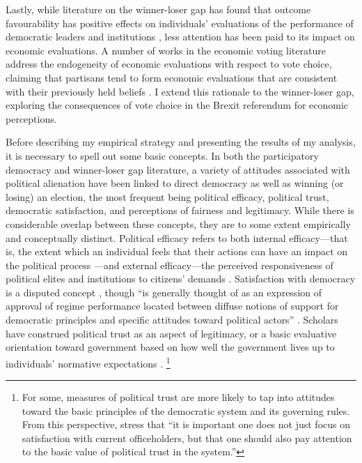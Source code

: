 \documentclass[12pt, letter]{article}
\begin{document}
Lastly, while literature on the winner-loser gap has found that outcome favourability has positive effects on individuals' evaluations of the performance of democratic leaders and institutions \parencite{singh2011winning}, less attention has been paid to its impact on economic evaluations. A number of works in the economic voting literature address the endogeneity of economic evaluations with respect to vote choice, claiming that partisans tend to form economic evaluations that are consistent with their previously held beliefs \parencite{anderson2007end, evans2006political, wlezien1997economic}. I extend this rationale to the winner-loser gap, exploring the consequences of vote choice in the Brexit referendum for economic perceptions.

Before describing my empirical strategy and presenting the results of my analysis, it is necessary to spell out some basic concepts. In both the participatory democracy and winner-loser gap literature, a variety of attitudes associated with political alienation have been linked to direct democracy as well as winning (or losing) an election, the most frequent being political efficacy, political trust, democratic satisfaction, and perceptions of fairness and legitimacy. While there is considerable overlap between these concepts, they are to some extent empirically and conceptually distinct. Political efficacy refers to both internal efficacy---that is, the extent which an individual feels that their actions can have an impact on the political process \parencite{campbell1954voter}---and external efficacy---the perceived responsiveness of political elites and institutions to citizens' demands \parencite{lane1959why, niemi1991winning}. Satisfaction with democracy is a disputed concept \parencite{linde2003satisfaction}, though ``is generally thought of as an expression of approval of regime performance located between diffuse notions of support for democratic principles and specific attitudes toward political actors'' \parencite[86]{blais2017election}. Scholars have construed political trust as an aspect of legitimacy, or a basic evaluative orientation toward government based on how well the government lives up to individuals' normative expectations \parencite{hetherington1998political, citrin2018trust}. \footnote{For some, measures of political trust are more likely to tap into attitudes toward the basic principles of the democratic system and its governing rules. From this perspective, \textcite[48]{hooghe2016elections} stress that ``it is important one does not just focus on satisfaction with current officeholders, but that one should also pay attention to the basic value of political trust in the system.''}
\end{document}
